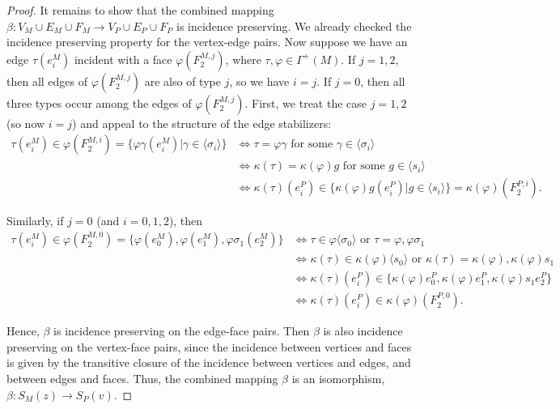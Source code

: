 \documentclass[12pt]{article}
\theoremstyle{definition}\newtheorem{definition}{Definition}[section]
\begin{document}
\begin{proof}
It remains to show that the combined mapping $\beta: V_M \cup E_M \cup F_M \rightarrow V_P \cup E_P \cup F_P$ is incidence preserving. We already checked the incidence preserving property for the vertex-edge pairs. Now suppose we have an edge $\tau(e_i^M)$ incident with a face $\varphi(F_2^{M,j})$,  where $\tau,\varphi\in \Gamma^+(M)$. If $j=1,2$, then all edges of $\varphi(F_2^{M,j})$ are also of type $j$, so we have $i=j$. If $j=0$, then all three types occur among the edges of $\varphi(F_2^{M,j})$. First, we treat the case $j=1,2$ (so now $i=j$) and appeal to the structure of the edge stabilizers: 
\begin{equation}
    \begin{aligned}\nonumber
    \tau(e_i^M) \in \varphi(F_2^{M,i}) = \{\varphi\gamma(e_i^M)|\gamma \in \langle \sigma_i \rangle\} 
        &\!\iff\! \tau = \varphi \gamma \text{ for some } 
                            \gamma \in \langle \sigma_i \rangle\\
        &\!\iff\! \kappa(\tau) = \kappa(\varphi) g \text{ for some } 
                            g \in \langle s_i \rangle\\
        &\!\iff\! \kappa(\tau)(e_i^P) \in \{\kappa(\varphi)g(e_i^P)|g \in \langle s_i \rangle\}=\kappa(\varphi)(F_2^{P,i}).
    \end{aligned}
\end{equation}

\noindent Similarly, if $j=0$ (and $i=0,1,2$), then 
\begin{equation}
    \begin{aligned}\nonumber
    \tau(e_i^M) \in \varphi(F_2^{M,0}) \!=\! \{\varphi(e_0^M),\varphi(e_1^M), \varphi \sigma_1(e_2^M)\}
    &\iff \tau \in \varphi\langle \sigma_0 \rangle \text{ or } \tau = \varphi,\varphi\sigma_1 \\
    &\iff \kappa(\tau) \in \kappa(\varphi)\langle s_0 \rangle \text{ or } \kappa(\tau) =    
      \kappa(\varphi),\kappa(\varphi)s_1\\
    &\iff \kappa(\tau)(e_i^P) \in \{\kappa(\varphi)e_0^P, \kappa(\varphi)e_1^P, \kappa(\varphi)s_1e_2^P\} \\
    &\iff \kappa(\tau)(e_i^P) \in \kappa(\varphi)(F_2^{P,0}).
    \end{aligned}
\end{equation}

\noindent Hence, $\beta$ is incidence preserving on the edge-face pairs. Then $\beta$ is also incidence preserving on the vertex-face pairs, since the incidence between vertices and faces is given by the transitive closure of the incidence between vertices and edges, and between edges and faces. Thus, the combined mapping $\beta$ is an isomorphism, $\beta: {S}_M(z) \rightarrow {S}_P(v)$.
\smallskip


\end{proof}
\end{document}
